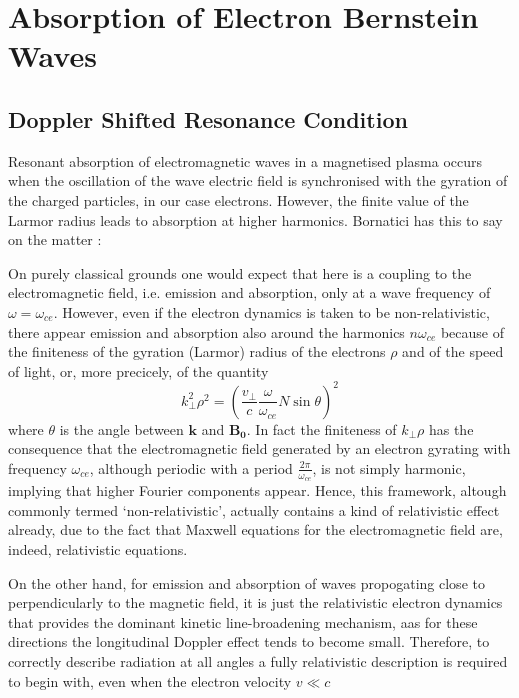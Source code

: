 \section{Absorption of Electron Bernstein Waves}
\subsection{Doppler Shifted Resonance Condition}
Resonant absorption of electromagnetic waves in a magnetised plasma occurs when the oscillation of the wave electric field is synchronised with the gyration of the charged particles, in our case electrons. However, the finite value of the Larmor radius leads to absorption at higher harmonics. Bornatici has this to say on the matter \cite{bornatici1983}:

On purely classical grounds one would expect that here is a coupling to the electromagnetic field, i.e. emission and absorption, only at a wave frequency of $\omega=\omega_{ce}$. However, even if the electron dynamics is taken to be non-relativistic, there appear emission and absorption also around the harmonics $n\omega_{ce}$ because of the finiteness of the gyration (Larmor) radius of the electrons $\rho$ and of the speed of light, or, more precicely, of the quantity
\begin{equation}
k_{\perp}^2\rho^2=\left( \frac{v_{\perp}}{c} \frac{\omega}{\omega_{ce}} N \sin \theta \right)^2
\end{equation}
where $\theta$ is the angle between $\bm{k}$ and $\bm{B_0}$. In fact the finiteness of $k_{\perp}\rho$ has the consequence that the electromagnetic field generated by an electron gyrating with frequency $\omega_{ce}$, although periodic with a period $\frac{2\pi}{\omega_{ce}}$, is not simply harmonic, implying that higher Fourier components appear. Hence, this framework, altough commonly termed `non-relativistic', actually contains a kind of relativistic effect already, due to the fact that Maxwell equations for the electromagnetic field are, indeed, relativistic equations.

On the other hand, for emission and absorption of waves propogating close to perpendicularly to the magnetic field, it is just the relativistic electron dynamics that provides the dominant kinetic line-broadening mechanism, aas for these directions the longitudinal Doppler effect tends to become small. Therefore, to correctly describe radiation at all angles a fully relativistic description is required to begin with, even when the electron velocity $v \ll c$

